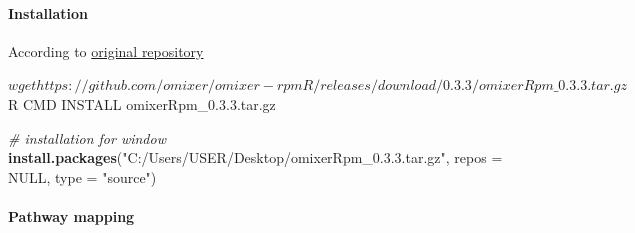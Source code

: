 \documentclass[
]{article}
\newenvironment{Shaded}{\begin{snugshade}}{\end{snugshade}}
\newcommand{\AttributeTok}[1]{\textcolor[rgb]{0.13,0.29,0.53}{#1}}
\newcommand{\CommentTok}[1]{\textcolor[rgb]{0.56,0.35,0.01}{\textit{#1}}}
\newcommand{\ConstantTok}[1]{\textcolor[rgb]{0.56,0.35,0.01}{#1}}
\newcommand{\ExtensionTok}[1]{#1}
\newcommand{\FunctionTok}[1]{\textcolor[rgb]{0.13,0.29,0.53}{\textbf{#1}}}
\newcommand{\NormalTok}[1]{#1}
\newcommand{\StringTok}[1]{\textcolor[rgb]{0.31,0.60,0.02}{#1}}
\begin{document}
\hypertarget{installation}{%
\paragraph{Installation}\label{installation}}

According to
\href{https://github.com/omixer/omixer-rpmR?tab=readme-ov-file}{original
repository}

\begin{Shaded}
\begin{Highlighting}[]
\ExtensionTok{$}\NormalTok{ wget https://github.com/omixer/omixer{-}rpmR/releases/download/0.3.3/omixerRpm\_0.3.3.tar.gz}
\ExtensionTok{$}\NormalTok{ R CMD INSTALL omixerRpm\_0.3.3.tar.gz}
\end{Highlighting}
\end{Shaded}

\begin{Shaded}
\begin{Highlighting}[]
\CommentTok{\# installation for window}
\FunctionTok{install.packages}\NormalTok{(}\StringTok{"C:/Users/USER/Desktop/omixerRpm\_0.3.3.tar.gz"}\NormalTok{, }
                 \AttributeTok{repos =} \ConstantTok{NULL}\NormalTok{, }
                 \AttributeTok{type =} \StringTok{"source"}\NormalTok{)}
\end{Highlighting}
\end{Shaded}

\hypertarget{pathway-mapping}{%
\paragraph{Pathway mapping}\label{pathway-mapping}}
\end{document}
